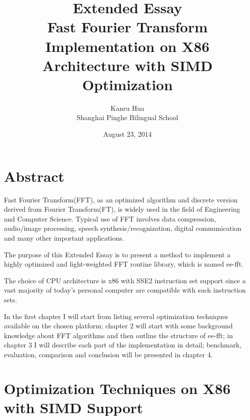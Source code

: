 \documentclass[a4paper]{report}
\begin{document}
\title{\Huge{Extended Essay} \\[2cm] \Large{Fast Fourier Transform Implementation on X86 Architecture with SIMD Optimization} \\[1cm]}
\author{Kanru Hua \\[0.5cm] Shanghai Pinghe Bilingual School}
\date{August 23, 2014}
\maketitle

\newpage

\chapter*{Abstract} \indent

	Fast Fourier Transform(FFT), as an optimized algorithm and discrete version derived from Fourier Transform(FT), is widely used in the field of Engineering and Computer Science. %
	Typical use of FFT involves data compression, audio/image processing, speech synthesis/recognization, digital communication and many other important applications.
	
	The purpose of this Extended Essay is to present a method to implement a highly optimized and light-weighted FFT routine library, which is named ee-fft.

	The choice of CPU architecture is x86 with SSE2 instruction set support since a vast majority of today's personal computer are compatible with such instruction sets.
	
	In the first chapter I will start from listing several optimization techniques available on the chosen platform; chapter 2 will start with some background knowledge about FFT algorithms and then outline the structure of ee-fft; in chapter 3 I will describe each part of the implementation in detail; benchmark, evaluation, comparison and conclusion will be presented in chapter 4.

\newpage
\tableofcontents

\newpage

\chapter{Optimization Techniques on X86 with SIMD Support} \indent
\end{document}
